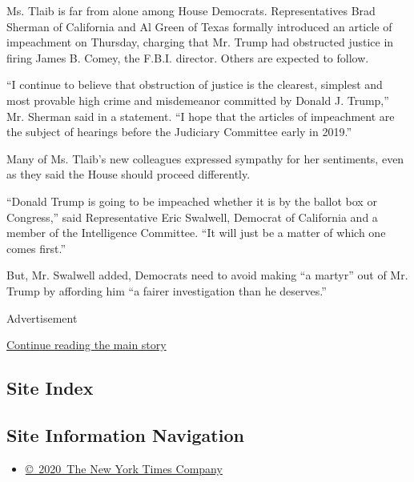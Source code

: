 Ms. Tlaib is far from alone among House Democrats. Representatives Brad
Sherman of California and Al Green of Texas formally introduced an
article of impeachment on Thursday, charging that Mr. Trump had
obstructed justice in firing James B. Comey, the F.B.I. director. Others
are expected to follow.

``I continue to believe that obstruction of justice is the clearest,
simplest and most provable high crime and misdemeanor committed by
Donald J. Trump,'' Mr. Sherman said in a statement. ``I hope that the
articles of impeachment are the subject of hearings before the Judiciary
Committee early in 2019.''

Many of Ms. Tlaib's new colleagues expressed sympathy for her
sentiments, even as they said the House should proceed differently.

``Donald Trump is going to be impeached whether it is by the ballot box
or Congress,'' said Representative Eric Swalwell, Democrat of California
and a member of the Intelligence Committee. ``It will just be a matter
of which one comes first.''

But, Mr. Swalwell added, Democrats need to avoid making ``a martyr'' out
of Mr. Trump by affording him ``a fairer investigation than he
deserves.''

Advertisement

\protect\hyperlink{after-bottom}{Continue reading the main story}

\hypertarget{site-index}{%
\subsection{Site Index}\label{site-index}}

\hypertarget{site-information-navigation}{%
\subsection{Site Information
Navigation}\label{site-information-navigation}}

\begin{itemize}
\tightlist
\item
  \href{https://help.nytimes3xbfgragh.onion/hc/en-us/articles/115014792127-Copyright-notice}{©~2020~The
  New York Times Company}
\end{itemize}

